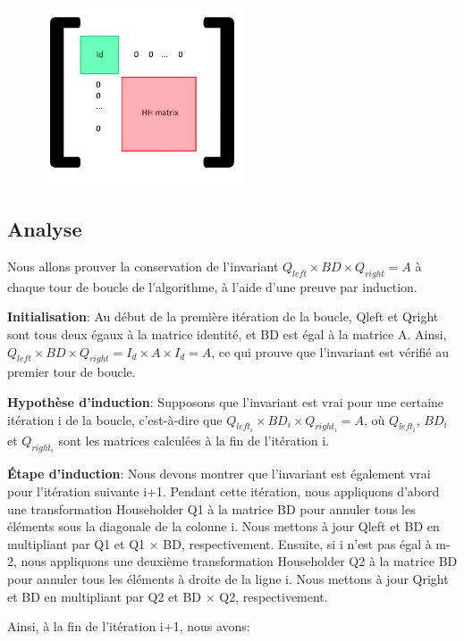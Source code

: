 \documentclass{article}
\begin{document}
\begin{figure}[!htb]
  \caption[]{}
  \label{img:pad_HH}
  \centering
  \includegraphics[width=6cm]{../files/hh_padded.png}
\end{figure}

\subsection{Analyse}
\label{ssec:analyse_bidiag}

Nous allons prouver la conservation de l'invariant $Q_{left} \times BD \times Q_{right} = A$ 
à chaque tour de boucle de l'algorithme, à l'aide d'une preuve par induction.

\textbf{Initialisation}: Au début de la première itération de la boucle, 
Qleft et Qright sont tous deux égaux à la matrice identité, et BD est égal à la matrice A. 
Ainsi, $Q_{left} \times BD \times Q_{right} = I_d \times A \times I_d = A$, 
ce qui prouve que l'invariant est vérifié au premier tour de boucle.

\textbf{Hypothèse d'induction}: Supposons que l'invariant est vrai pour une certaine itération i de la boucle,
c'est-à-dire que $Q_{left_i} \times BD_i \times Q_{right_i} = A$, où $Q_{left_i}$, $BD_i$ et $Q_{right_i}$
sont les matrices calculées à la fin de l'itération i.

\textbf{Étape d'induction}: Nous devons montrer que l'invariant est également vrai pour l'itération suivante i+1. 
Pendant cette itération, nous appliquons d'abord une transformation Householder Q1 à la matrice BD pour annuler 
tous les éléments sous la diagonale de la colonne i. Nous mettons à jour Qleft et BD en multipliant par Q1 et Q1 $\times$ BD, respectivement. 
Ensuite, si i n'est pas égal à m-2, nous appliquons une deuxième transformation Householder Q2 à la matrice BD 
pour annuler tous les éléments à droite de la ligne i. Nous mettons à jour Qright et BD en multipliant par Q2 et BD $\times$ Q2, respectivement.

Ainsi, à la fin de l'itération i+1, nous avons:
\end{document}
